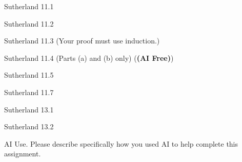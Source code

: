 \documentclass[minion]{homework}
\begin{document}
\begin{problems}

\problem Sutherland 11.1

\problem Sutherland 11.2

\problem Sutherland 11.3 (Your proof must use induction.)

\problem Sutherland 11.4 (Parts (a) and (b) only) (\textbf{(AI Free)})

\problem Sutherland 11.5

\problem Sutherland 11.7 

\problem Sutherland 13.1

\problem Sutherland 13.2

\problem AI Use. Please describe specifically how you used AI to help complete this assignment.

\end{problems}
\end{document}
